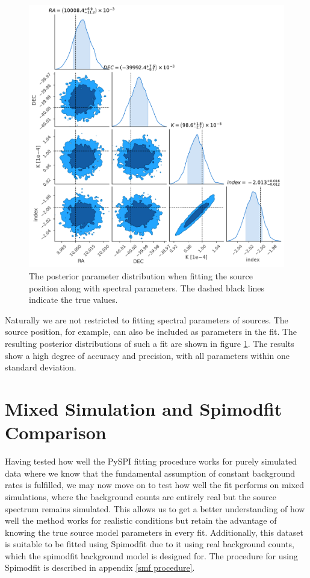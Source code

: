 \documentclass{report}
\begin{document}
\begin{figure}[h]
  \centering
  \includegraphics[width=\textwidth]{Images/Pure_Simulation/source_position.pdf}
  \caption{The posterior parameter distribution when fitting the source position along with spectral parameters. The dashed black lines indicate the true values.}
  \label{fig pos fit}
\end{figure}

Naturally we are not restricted to fitting spectral parameters of sources. The source position, for example, can also be included as parameters in the fit. The resulting posterior distributions of such a fit are shown in figure \ref{fig pos fit}. The results show a high degree of accuracy and precision, with all parameters within one standard deviation.


\section{Mixed Simulation and Spimodfit Comparison} \label{sec: smf comparison}




Having tested how well the PySPI fitting procedure works for purely simulated data where we know that the fundamental assumption of constant background rates is fulfilled, we may now move on to test how well the fit performs on mixed simulations, where the background counts are entirely real but the source spectrum remains simulated. This allows us to get a better understanding of how well the method works for realistic conditions but retain the advantage of knowing the true source model parameters in every fit. Additionally, this dataset is suitable to be fitted using Spimodfit due to it using real background counts, which the spimodfit background model is designed for. The procedure for using Spimodfit is described in appendix \ref{smf procedure}.
\end{document}
